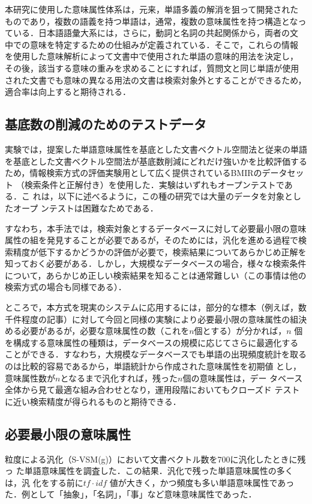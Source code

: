 本研究に使用した意味属性体系は，元来，単語多義の解消を狙って開発された
ものであり，複数の語義を持つ単語は，通常，複数の意味属性を持つ構造となっ
ている．日本語語彙大系には，さらに，動詞と名詞の共起関係から，両者の文
中での意味を特定するための仕組みが定義されている．そこで，これらの情報
を使用した意味解析によって文書中で使用された単語の意味的用法を決定し，
その後，該当する意味の重みを求めることにすれば，質問文と同じ単語が使用
された文書でも意味の異なる用法の文書は検索対象外とすることができるため，
適合率は向上すると期待される．

\subsection{基底数の削減のためのテストデータ}

実験では，提案した単語意味属性を基底とした文書ベクトル空間法と従来の単語
を基底とした文書ベクトル空間法が基底数削減にどれだけ強いかを比較評価する
ため，情報検索方式の評価実験用として広く提供されているBMIRのデータセット
（検索条件と正解付き）を使用した．実験はいずれもオープンテストである．こ
れは，以下に述べるように，この種の研究では大量のデータを対象としたオープ
ンテストは困難なためである．

すなわち，本手法では，検索対象とするデータベースに対して必要最小限の意味
属性の組を発見することが必要であるが，そのためには，汎化を進める過程で検
索精度が低下するかどうかの評価が必要で，検索結果についてあらかじめ正解を
知っておく必要がある．しかし，大規模なデータベースの場合，様々な検索条件
について，あらかじめ正しい検索結果を知ることは通常難しい（この事情は他の
検索方式の場合も同様である）．　

ところで，本方式を現実のシステムに応用するには，部分的な標本（例えば，数
千件程度の記事）に対して今回と同様の実験により必要最小限の意味属性の組決
める必要があるが，必要な意味属性の数（これを$n$個とする）が分かれば，$n$ 
個を構成する意味属性の種類は，データベースの規模に応じてさらに最適化する
ことができる．すなわち，大規模なデータベースでも単語の出現頻度統計を取る
のは比較的容易であるから，単語統計から作成された意味属性を初期値
とし，意味属性数が$n$となるまで汎化すれば，残った$n$個の意味属性は，デー
タベース全体から見て最適な組み合わせとなり，運用段階においてもクローズド
テストに近い検索精度が得られるものと期待できる．

\subsection{必要最小限の意味属性}

粒度による汎化（S-VSM(g)）において文書ベクトル数を700に汎化したときに残っ
た単語意味属性を調査した．この結果．汎化で残った単語意味属性の多くは，汎
化をする前に$tf \cdot idf$ 値が大きく，かつ頻度も多い単語意味属性であっ
た．例として「抽象」，「名詞」，「事」など意味意味属性であった．

